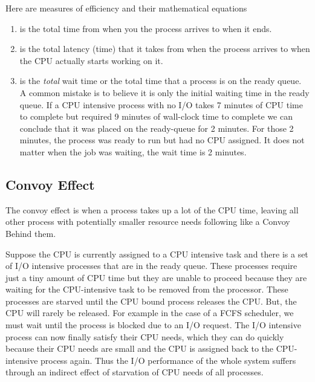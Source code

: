 Here are measures of efficiency and their mathematical equations

\begin{enumerate}
\item {} is the total time from when you the process arrives to when it ends.
  \item {} is the total latency (time) that it takes from when the process arrives to when the CPU actually starts working on it.
  \item {} is the \emph{total} wait time or the total time that a process is on the ready queue.
    A common mistake is to believe it is only the initial waiting time in the ready queue.
    If a CPU intensive process with no I/O takes 7 minutes of CPU time to complete but required 9 minutes of wall-clock time to complete we can conclude that it was placed on the ready-queue for 2 minutes.
    For those 2 minutes, the process was ready to run but had no CPU assigned.
    It does not matter when the job was waiting, the wait time is 2 minutes.

\end{enumerate}

\subsection{Convoy Effect}

The convoy effect is when a process takes up a lot of the CPU time, leaving all other process with potentially smaller resource needs following like a Convoy Behind them.

Suppose the CPU is currently assigned to a CPU intensive task and there is a set of I/O intensive processes that are in the ready queue.
These processes require just a tiny amount of CPU time but they are unable to proceed because they are waiting for the CPU-intensive task to be removed from the processor.
These processes are starved until the CPU bound process releases the CPU.
But, the CPU will rarely be released.
For example in the case of a FCFS scheduler, we must wait until the process is blocked due to an I/O request.
The I/O intensive process can now finally satisfy their CPU needs, which they can do quickly because their CPU needs are small and the CPU is assigned back to the CPU-intensive process again.
Thus the I/O performance of the whole system suffers through an indirect effect of starvation of CPU needs of all processes.

